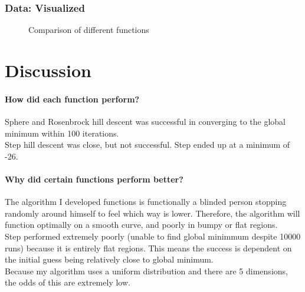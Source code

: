 \documentclass{article}
\begin{document}
\subsubsection{Data: Visualized}

\begin{figure}[H]
    \centering
    \hfill
    \hfill
    \caption{Comparison of different functions}
    \label{fig:functions}
\end{figure}

\section{Discussion}
\paragraph{How did each function perform?}
Sphere and Rosenbrock hill descent was successful in converging to the global minimum within 100 iterations. \\
Step hill descent was close, but not successful. Step ended up at a minimum of -26. 

\paragraph{Why did certain functions perform better?}
The algorithm I developed functions is functionally a blinded person stopping randomly around himself to feel which way is lower. Therefore, the algorithm will function optimally on a smooth curve, and poorly in bumpy or flat regions.\\
Step performed extremely poorly (unable to find global minimmum despite 10000 runs) because it is entirely flat regions. This means the success is dependent on the initial guess being relatively close to global minimum. \\
Because my algorithm uses a uniform distribution and there are 5 dimensions, the odds of this are extremely low. 
\end{document}
